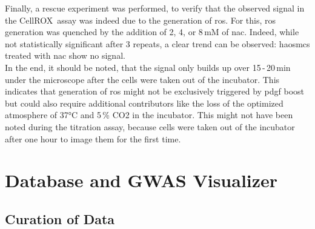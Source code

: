 Finally, a rescue experiment was performed, to verify that the observed signal in the CellROX\texttrademark~assay was indeed due to the generation of \ac{ros}. For this, \ac{ros} generation was quenched by the addition of 2, 4, or 8\,mM of \ac{nac}. Indeed, while not statistically significant after 3 repeats, a clear trend can be observed: \acp{haosmc} treated with \ac{nac} show no signal.\\
In the end, it should be noted, that the signal only builds up over 15\,-\,20\,min under the microscope after the cells were taken out of the incubator. This indicates that generation of \ac{ros} might not be exclusively triggered by \ac{pdgf} boost but could also require additional contributors like the loss of the optimized atmosphere of 37°C and 5\,\% CO2 in the incubator. This might not have been noted during the titration assay, because cells were taken out of the incubator after one hour to image them for the first time.

\section{Database and GWAS Visualizer}

    \subsection{Curation of Data}

